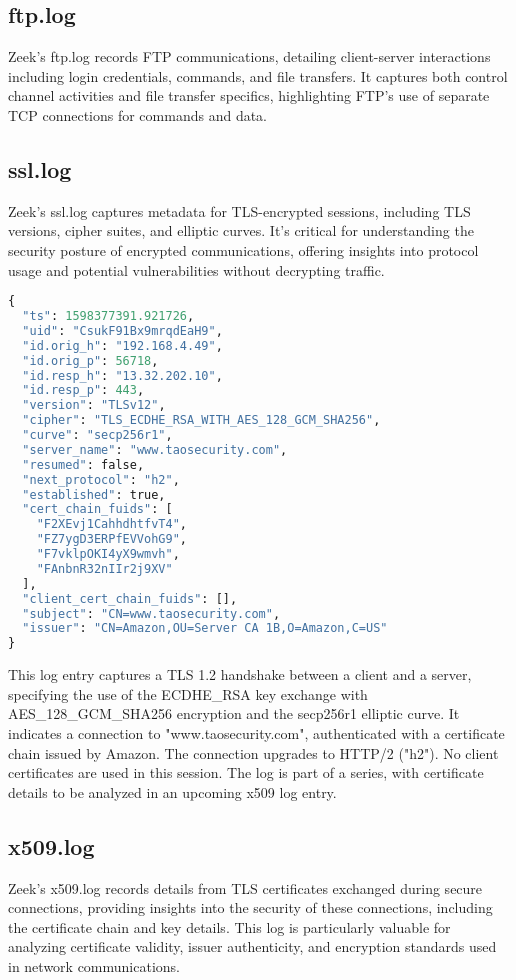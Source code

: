 \subsection{ftp.log}
Zeek's ftp.log records FTP communications, detailing client-server interactions including login credentials, commands, and file transfers. It captures both control channel activities and file transfer specifics, highlighting FTP's use of separate TCP connections for commands and data.

\subsection{ssl.log}
Zeek's ssl.log captures metadata for TLS-encrypted sessions, including TLS versions, cipher suites, and elliptic curves. It's critical for understanding the security posture of encrypted communications, offering insights into protocol usage and potential vulnerabilities without decrypting traffic.
\begin{lstlisting}[language=Python, caption= ssl.log entry]
{
  "ts": 1598377391.921726,
  "uid": "CsukF91Bx9mrqdEaH9",
  "id.orig_h": "192.168.4.49",
  "id.orig_p": 56718,
  "id.resp_h": "13.32.202.10",
  "id.resp_p": 443,
  "version": "TLSv12",
  "cipher": "TLS_ECDHE_RSA_WITH_AES_128_GCM_SHA256",
  "curve": "secp256r1",
  "server_name": "www.taosecurity.com",
  "resumed": false,
  "next_protocol": "h2",
  "established": true,
  "cert_chain_fuids": [
    "F2XEvj1CahhdhtfvT4",
    "FZ7ygD3ERPfEVVohG9",
    "F7vklpOKI4yX9wmvh",
    "FAnbnR32nIIr2j9XV"
  ],
  "client_cert_chain_fuids": [],
  "subject": "CN=www.taosecurity.com",
  "issuer": "CN=Amazon,OU=Server CA 1B,O=Amazon,C=US"
}
\end{lstlisting}
This log entry captures a TLS 1.2 handshake between a client and a server, specifying the use of the ECDHE\_RSA key exchange with AES\_128\_GCM\_SHA256 encryption and the secp256r1 elliptic curve. It indicates a connection to "www.taosecurity.com", authenticated with a certificate chain issued by Amazon. The connection upgrades to HTTP/2 ("h2"). No client certificates are used in this session. The log is part of a series, with certificate details to be analyzed in an upcoming x509 log entry.

\subsection{x509.log}
Zeek's x509.log records details from TLS certificates exchanged during secure connections, providing insights into the security of these connections, including the certificate chain and key details. This log is particularly valuable for analyzing certificate validity, issuer authenticity, and encryption standards used in network communications.

